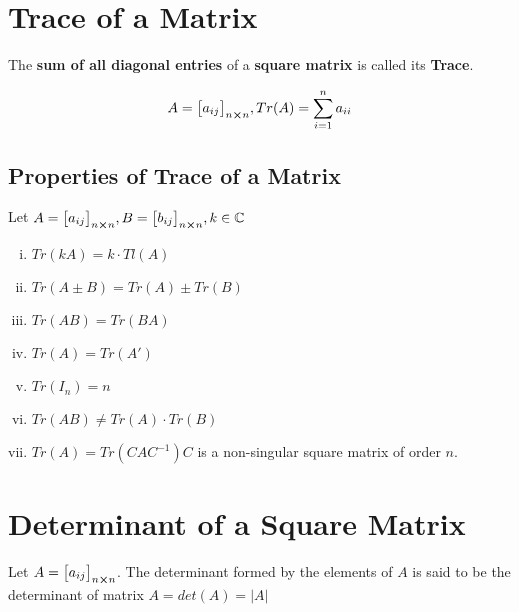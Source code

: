 \documentclass{article}
\begin{document}
\section{Trace of a Matrix}
The \textbf{sum of all diagonal entries} of a \textbf{square matrix} is called its \textbf{Trace}.

$$A={\begin{bmatrix}
        a_{ij}
    \end{bmatrix}}_{n \cross n}, Tr(A)=\displaystyle \sum _{i=1}^{n} a_{ii} $$

\subsection{Properties of Trace of a Matrix}

Let $A={\begin{bmatrix}
        a_{ij}
    \end{bmatrix}}_{n \cross n}, B={\begin{bmatrix}
                b_{ij}
            \end{bmatrix}}_{n \cross n}, k \in \mathbb{C} $
\begin{enumerate}[i.]
    \item $Tr(kA)=k \cdot Tl(A) $
    \item $Tr(A \pm B)= Tr(A) \pm Tr(B)$
    \item $Tr(AB)=Tr(BA)$
    \item $Tr(A)=Tr(A')$
    \item $Tr(I_{n})=n$
    \item $Tr(AB) \not= Tr(A) \cdot Tr(B)$
    \item $Tr(A)=Tr(CAC^{-1}) C$ is a non-singular square matrix of order $n$.
\end{enumerate}

\section{Determinant of a Square Matrix}
Let $A={\begin{bmatrix}
        a_{ij}
    \end{bmatrix}}_{n \cross n} $. The determinant formed by the elements of $A$ is said to be the determinant of matrix $A= det(A)= |A|$
\end{document}

